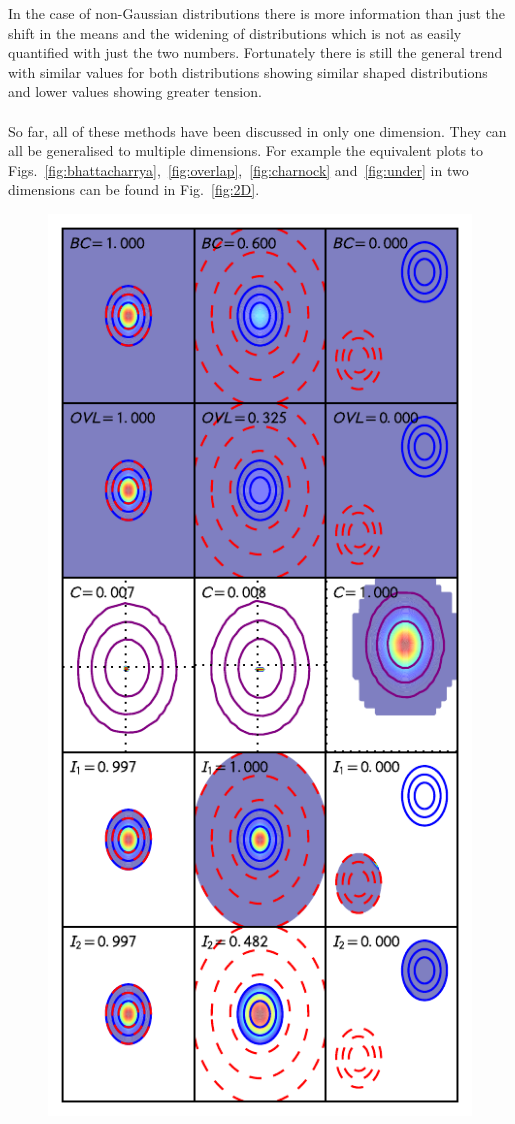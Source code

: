 \documentclass[twocolumn]{revtex4-1}
\begin{document}
    In the case of non-Gaussian distributions there is more information than just the shift in the means and the widening of distributions which is not as easily quantified with just the two numbers.
    Fortunately there is still the general trend with similar values for both distributions showing similar shaped distributions and lower values showing greater tension.
    \\
    \\
    So far, all of these methods have been discussed in only one dimension.
    They can all be generalised to multiple dimensions.
    For example the equivalent plots to Figs.~\ref{fig:bhattacharrya},~\ref{fig:overlap},~\ref{fig:charnock} and~\ref{fig:under} in two dimensions can be found in Fig.~\ref{fig:2D}.
    \begin{figure}
        \centering
        \includegraphics{../comparison/plots/2D.pdf}

\end{figure}
\end{document}

